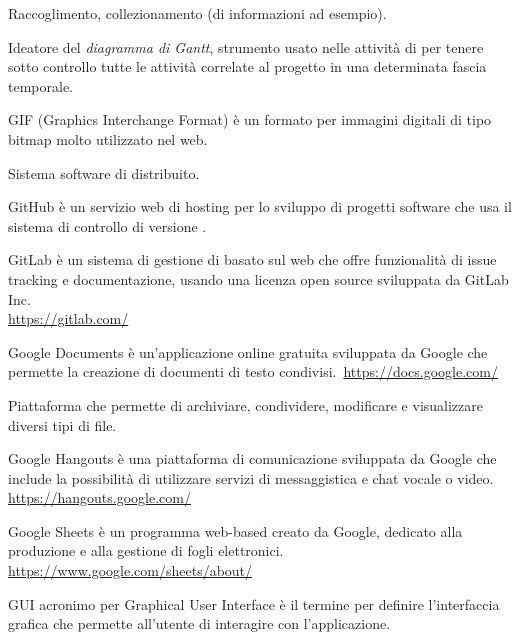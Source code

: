 Raccoglimento, collezionamento (di informazioni ad esempio).

Ideatore del \textit{diagramma di Gantt}, strumento usato nelle attività di  per tenere sotto controllo tutte le attività correlate al progetto in una determinata fascia temporale.

GIF (Graphics Interchange Format) è un formato per immagini digitali di tipo bitmap molto utilizzato nel web. 

Sistema software di  distribuito.

GitHub è un servizio web di hosting per lo sviluppo di progetti software che usa il sistema di controllo di versione .

GitLab è un sistema di gestione di   basato sul web che offre funzionalità di issue tracking e documentazione, usando una licenza open source sviluppata da GitLab Inc.\\
\url{https://gitlab.com/}

Google Documents è un'applicazione online gratuita sviluppata da Google che permette la creazione di documenti di testo condivisi.\
\url{https://docs.google.com/}

Piattaforma che permette di archiviare, condividere, modificare e visualizzare diversi tipi di file.

Google Hangouts è una piattaforma di comunicazione sviluppata da Google che include la possibilità di utilizzare servizi di messaggistica e chat vocale o video.\\
\url{https://hangouts.google.com/}

Google Sheets è un programma web-based creato da Google, dedicato alla produzione e alla gestione di fogli elettronici.\\
\url{https://www.google.com/sheets/about/}

GUI acronimo per Graphical User Interface è il termine per definire l'interfaccia grafica che permette all'utente di interagire con l'applicazione.
\clearpage
